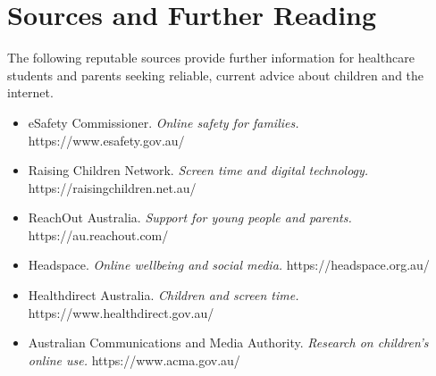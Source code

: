 \section*{Sources and Further Reading}
The following reputable sources provide further information for healthcare students and parents seeking reliable, current advice about children and the internet.
\begin{itemize}
    \item eSafety Commissioner. \textit{Online safety for families.} https://www.esafety.gov.au/
    \item Raising Children Network. \textit{Screen time and digital technology.} https://raisingchildren.net.au/
    \item ReachOut Australia. \textit{Support for young people and parents.} https://au.reachout.com/
    \item Headspace. \textit{Online wellbeing and social media.} https://headspace.org.au/
    \item Healthdirect Australia. \textit{Children and screen time.} https://www.healthdirect.gov.au/
    \item Australian Communications and Media Authority. \textit{Research on children's online use.} https://www.acma.gov.au/
\end{itemize}
